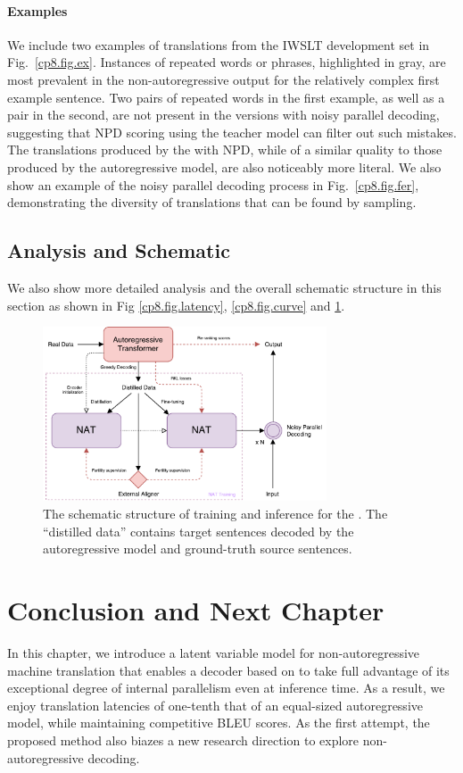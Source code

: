 \paragraph{Examples}
We include two examples of translations from the IWSLT development set in Fig.~\ref{cp8.fig.ex}.
Instances of repeated words or phrases, highlighted in gray, are most prevalent in the non-autoregressive output for the relatively complex first example sentence. Two pairs of repeated words in the first example, as well as a pair in the second, are not present in the versions with noisy parallel decoding, suggesting that NPD scoring using the teacher model can filter out such mistakes. The translations produced by the \model{} with NPD, while of a similar quality to those produced by the autoregressive model, are also noticeably more literal. 
We also show an example of the noisy parallel decoding process in Fig.~\ref{cp8.fig.fer}, demonstrating the diversity of translations that can be found by sampling.

\subsection{Analysis and Schematic}
We also show more detailed analysis and the overall schematic structure in this section as shown in Fig \ref{cp8.fig.latency}, \ref{cp8.fig.curve} and \ref{cp8.fig.sch}. 
\begin{figure}[hptb]
\centering
\includegraphics[width=0.75\textwidth]{figs/nat/NAT-overall}
\caption{\label{cp8.fig.sch}The schematic structure of training and inference for the \model. The ``distilled data'' contains target sentences decoded by the autoregressive model and ground-truth source sentences.}
\end{figure}



\section{Conclusion and Next Chapter}
In this chapter, we introduce a latent variable model for non-autoregressive machine translation that enables a decoder based on \citet{vaswani2017attention} to take full advantage of its exceptional degree of internal parallelism even at inference time. As a result, we enjoy translation latencies of one-tenth that of an equal-sized autoregressive model, while maintaining competitive BLEU scores. As the first attempt, the proposed method also biazes a new research direction to explore non-autoregressive decoding.


